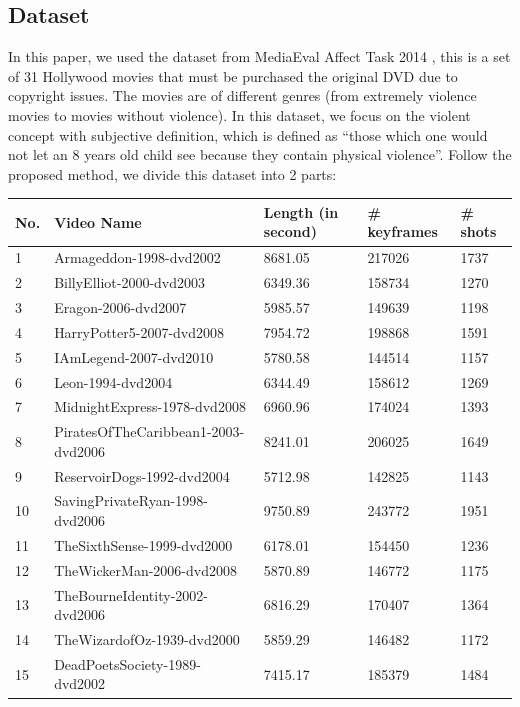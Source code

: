 \documentclass[review]{elsarticle}
\begin{document}
\subsection{Dataset}
In this paper, we used the dataset from MediaEval  Affect Task 2014 \cite{demarty2014benchmarking}, this is a set of 31 Hollywood movies that must be purchased the original DVD due to copyright issues. The movies are of different genres (from extremely violence movies to movies without violence). In this dataset, we focus on the violent concept with subjective definition, which is defined as “those which one would not let an 8 years old child see because they contain physical violence”. Follow the proposed method, we divide this dataset into 2 parts:
\begin{table}[!t]
\begin{tabular}{ |p{} | p{} | p{} | p{} | p{} | }
	\hline
	No. & Video Name & Length (in second) & \# keyframes & \# shots \\ \hline
	1 & Armageddon-1998-dvd2002 & 8681.05 & 217026 & 1737 \\ \hline
	2 & BillyElliot-2000-dvd2003 & 6349.36 & 158734 & 1270 \\ \hline
	3 & Eragon-2006-dvd2007 & 5985.57 & 149639 & 1198 \\ \hline
	4 & HarryPotter5-2007-dvd2008 & 7954.72 & 198868 & 1591 \\ \hline
	5 & IAmLegend-2007-dvd2010 & 5780.58 & 144514 & 1157 \\ \hline
	6 & Leon-1994-dvd2004 & 6344.49 & 158612 & 1269 \\ \hline
	7 & MidnightExpress-1978-dvd2008 & 6960.96 & 174024 & 1393 \\ \hline
	8 & PiratesOfTheCaribbean1-2003-dvd2006 & 8241.01 & 206025 & 1649 \\ \hline
	9 & ReservoirDogs-1992-dvd2004 & 5712.98 & 142825 & 1143 \\ \hline
	10 & SavingPrivateRyan-1998-dvd2006 & 9750.89 & 243772 & 1951 \\ \hline
	11 & TheSixthSense-1999-dvd2000 & 6178.01 & 154450 & 1236 \\ \hline
	12 & TheWickerMan-2006-dvd2008 & 5870.89 & 146772 & 1175 \\ \hline
	13 & TheBourneIdentity-2002-dvd2006 & 6816.29 & 170407 & 1364 \\ \hline
	14 & TheWizardofOz-1939-dvd2000 & 5859.29 & 146482 & 1172 \\ \hline
	15 & DeadPoetsSociety-1989-dvd2002 & 7415.17 & 185379 & 1484 \\ \hline

\end{tabular}
\end{table}
\end{document}
